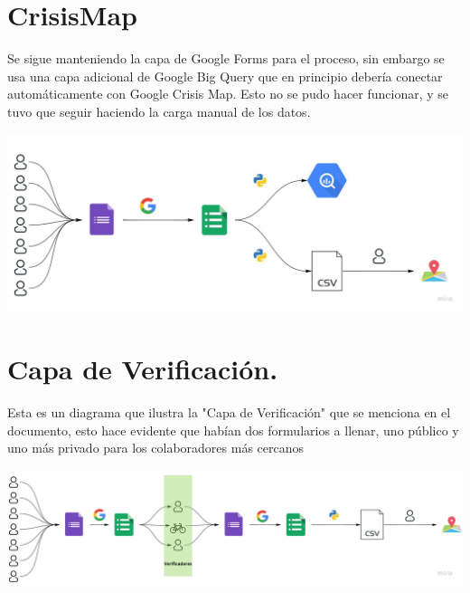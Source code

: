 \documentclass[12pt,spanish,oneside,breaklinks]{book}
\begin{document}
\begin{appendices}
\section{CrisisMap}
\label{sec:org7146125}
Se sigue manteniendo la capa de Google Forms para el proceso, sin embargo se usa una capa adicional de Google Big Query que en principio debería conectar automáticamente con Google Crisis Map. Esto no se pudo hacer funcionar, y se tuvo que seguir haciendo la carga manual de los datos.
\begin{center}
\includegraphics[width=.9\linewidth]{./img/crisismap.jpeg}
\end{center}

\section{Capa de Verificación.}
\label{sec:orgf261fd7}
Esta es un diagrama que ilustra la "Capa de Verificación" que se menciona en el documento, esto hace evidente que habían dos formularios a llenar, uno público y uno más privado para los colaboradores más cercanos
\begin{center}
\includegraphics[width=.9\linewidth]{./img/verificacion.jpeg}
\end{center}

\end{appendices}
\end{document}
